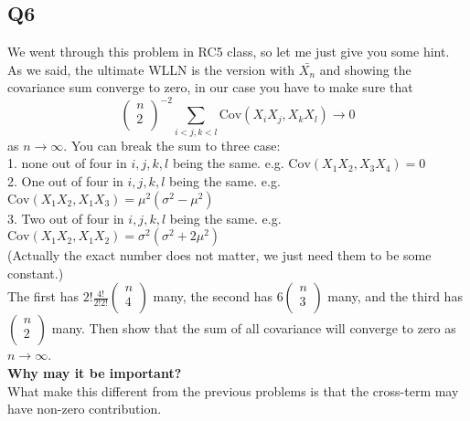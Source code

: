 \documentclass[12pt]{article}
\begin{document}
\subsection*{Q6}
We went through this problem in RC5 class, so let me just give you some hint. \\
As we said, the ultimate WLLN is the version with \(\bar{X_n}\) and showing the covariance sum converge to zero, in our case 
you have to make sure that 
\[
    \begin{pmatrix}
         n \\
         2 \\
    \end{pmatrix}^{-2} \sum_{i<j,k<l}\text{Cov}(X_i X_j, X_k X_l )   \to  0 
\] 
as \(n \to \infty \).  
You can break the sum to three case:\\ 
1. none out of four in \(i,j,k,l\) being the same. e.g. \(\text{Cov} (X_{1}X_2, X_{3}X_4)  = 0\) \\ 
2. One out of four in \(i,j,k,l\) being the same. e.g. \(\text{Cov}(X_1X_2, X_1X_3) = \mu^2(\sigma^{2} - \mu^2) \) \\
3. Two out of four in \(i,j,k,l\) being the same. e.g. \(\text{Cov}(X_{1}X_2, X_1 X_2 ) =  \sigma ^2 (\sigma ^2 + 2\mu^2)\) \\
(Actually the exact number does not matter, we just need them to be some constant.)\\
The first has \(2!\frac{4!}{2! 2!}\begin{pmatrix}
     n \\
     4 \\
\end{pmatrix}\) many, the second has \(6\begin{pmatrix}
     n \\
     3 \\
\end{pmatrix}\) many, and the third has \(\begin{pmatrix}
     n \\
     2 \\
\end{pmatrix}\) many.     
Then show that the sum of all covariance will converge to zero as \(n\to \infty \).  
\\
\textbf{Why may it be important?}\\
What make this different from the previous problems is that the cross-term may have non-zero contribution. 
\end{document}
